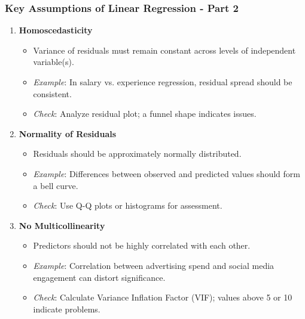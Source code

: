 \documentclass[aspectratio=169]{beamer}
\begin{document}
\begin{frame}[fragile]
    \frametitle{Key Assumptions of Linear Regression - Part 2}
    \begin{enumerate}[resume]
        \item \textbf{Homoscedasticity}
            \begin{itemize}
                \item Variance of residuals must remain constant across levels of independent variable(s).
                \item \textit{Example}: In salary vs. experience regression, residual spread should be consistent.
                \item \textit{Check}: Analyze residual plot; a funnel shape indicates issues.
            \end{itemize}

        \item \textbf{Normality of Residuals}
            \begin{itemize}
                \item Residuals should be approximately normally distributed.
                \item \textit{Example}: Differences between observed and predicted values should form a bell curve.
                \item \textit{Check}: Use Q-Q plots or histograms for assessment.
            \end{itemize}

        \item \textbf{No Multicollinearity}
            \begin{itemize}
                \item Predictors should not be highly correlated with each other.
                \item \textit{Example}: Correlation between advertising spend and social media engagement can distort significance.
                \item \textit{Check}: Calculate Variance Inflation Factor (VIF); values above 5 or 10 indicate problems.
            \end{itemize}
    \end{enumerate}
\end{frame}
\end{document}

